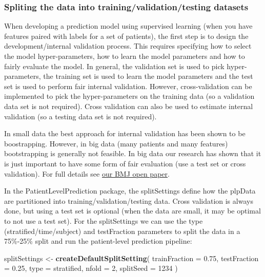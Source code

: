 \documentclass[
]{article}
\newenvironment{Shaded}{\begin{snugshade}}{\end{snugshade}}
\newcommand{\AttributeTok}[1]{\textcolor[rgb]{0.13,0.29,0.53}{#1}}
\newcommand{\DecValTok}[1]{\textcolor[rgb]{0.00,0.00,0.81}{#1}}
\newcommand{\FloatTok}[1]{\textcolor[rgb]{0.00,0.00,0.81}{#1}}
\newcommand{\FunctionTok}[1]{\textcolor[rgb]{0.13,0.29,0.53}{\textbf{#1}}}
\newcommand{\NormalTok}[1]{#1}
\newcommand{\OtherTok}[1]{\textcolor[rgb]{0.56,0.35,0.01}{#1}}
\newcommand{\StringTok}[1]{\textcolor[rgb]{0.31,0.60,0.02}{#1}}
\begin{document}
\hypertarget{spliting-the-data-into-trainingvalidationtesting-datasets-1}{%
\subsubsection{Spliting the data into training/validation/testing
datasets}\label{spliting-the-data-into-trainingvalidationtesting-datasets-1}}

When developing a prediction model using supervised learning (when you
have features paired with labels for a set of patients), the first step
is to design the development/internal validation process. This requires
specifying how to select the model hyper-parameters, how to learn the
model parameters and how to fairly evaluate the model. In general, the
validation set is used to pick hyper-parameters, the training set is
used to learn the model parameters and the test set is used to perform
fair internal validation. However, cross-validation can be implemented
to pick the hyper-parameters on the training data (so a validation data
set is not required). Cross validation can also be used to estimate
internal validation (so a testing data set is not required).

In small data the best approach for internal validation has been shown
to be boostrapping. However, in big data (many patients and many
features) bootstrapping is generally not feasible. In big data our
research has shown that it is just important to have some form of fair
evaluation (use a test set or cross validation). For full details see
\href{add\%20link}{our BMJ open paper}.

In the PatientLevelPrediction package, the splitSettings define how the
plpData are partitioned into training/validation/testing data. Cross
validation is always done, but using a test set is optional (when the
data are small, it may be optimal to not use a test set). For the
splitSettings we can use the type (stratified/time/subject) and
testFraction parameters to split the data in a 75\%-25\% split and run
the patient-level prediction pipeline:

\begin{Shaded}
\begin{Highlighting}[]
\NormalTok{  splitSettings }\OtherTok{\textless{}{-}} \FunctionTok{createDefaultSplitSetting}\NormalTok{(}
    \AttributeTok{trainFraction =} \FloatTok{0.75}\NormalTok{,}
    \AttributeTok{testFraction =} \FloatTok{0.25}\NormalTok{,}
    \AttributeTok{type =} \StringTok{\textquotesingle{}stratified\textquotesingle{}}\NormalTok{,}
    \AttributeTok{nfold =} \DecValTok{2}\NormalTok{, }
    \AttributeTok{splitSeed =} \DecValTok{1234}
\NormalTok{    )}
\end{Highlighting}
\end{Shaded}
\end{document}
